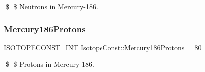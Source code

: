 \$ \$ Neutrons in Mercury-\/186. \mbox{\label{group___isotope_const-_mercury-_hg186_ga8940396a78f6a6de3cecfa06521c812c}} 
\subsubsection{\texorpdfstring{Mercury186\+Protons}{Mercury186Protons}}
{\footnotesize\ttfamily \mbox{\hyperlink{group___isotope_const-_macros_ga5f18360b3e99483a35c32d789e62621c}{I\+S\+O\+T\+O\+P\+E\+C\+O\+N\+S\+T\+\_\+\+I\+NT}} Isotope\+Const\+::\+Mercury186\+Protons = 80}

\$ \$ Protons in Mercury-\/186. 